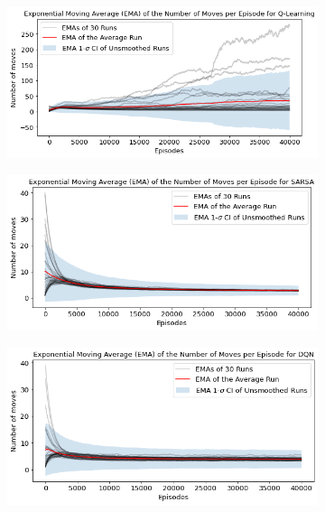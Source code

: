 \documentclass[conference]{IEEEtran}
\begin{document}
\begin{figure}[htbp!]
    \centering
    \begin{subfigure}[]{.45\textwidth}
        \centering
        \includegraphics[width=\textwidth]{../figures/n_moves_30_runs_qlearning.png}
        \caption{}
    \end{subfigure}
    \begin{subfigure}[]{.45\textwidth}
        \centering
        \includegraphics[width=\textwidth]{../figures/n_moves_30_runs_sarsa.png}
        \caption{}
    \end{subfigure}
    \begin{subfigure}[]{.45\textwidth}
        \centering
        \includegraphics[width=\textwidth]{../figures/n_moves_30_runs_dqn.png}
        \caption{}
    \end{subfigure}
    \caption{}
    \label{fig:30runs_n_moves}
\end{figure}
    
\end{document}
